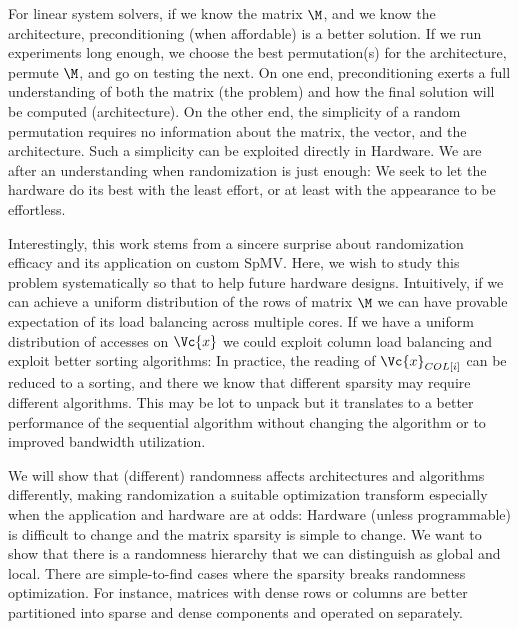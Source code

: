 \documentclass[manuscript,screen]{acmart}
\begin{document}
For linear system solvers, if we know the matrix $\M$, and we know the
architecture, preconditioning (when affordable) is a better solution.
If we run experiments long enough, we choose the best permutation(s)
for the architecture, permute $\M$, and go on testing the next.  On
one end, preconditioning exerts a full understanding of both the
matrix (the problem) and how the final solution will be computed
(architecture).  On the other end, the simplicity of a random
permutation requires no information about the matrix, the vector, and
the architecture. Such a simplicity can be exploited directly in
Hardware. We are after an understanding when randomization is just
enough: We seek to let the hardware do its best with the least effort,
or at least with the appearance to be effortless.


Interestingly, this work stems from a sincere surprise about
randomization efficacy and its application on custom SpMV. Here, we
wish to study this problem systematically so that to help future
hardware designs. Intuitively, if we can achieve a uniform
distribution of the rows of matrix $\M$ we can have provable
expectation of its load balancing across multiple cores. If we have a
uniform distribution of accesses on $\Vc{x}$ we could exploit column
load balancing and exploit better sorting algorithms: In practice, the
reading of $\Vc{x}_{COL[i]}$ can be reduced to a sorting, and there we know
that different sparsity  may require different algorithms. This may be 
lot to unpack but it translates to a better performance of the
sequential algorithm without changing the algorithm or to improved bandwidth
utilization.


We will show that (different) randomness affects architectures and
algorithms differently, making randomization a suitable optimization
transform especially when the application and hardware are at odds:
Hardware (unless programmable) is difficult to change and the matrix
sparsity is simple to change. We want to show that there is a
randomness hierarchy that we can distinguish as global and
local. There are simple-to-find cases where the sparsity breaks
randomness optimization.  For instance, matrices with dense rows or
columns are better partitioned into sparse and dense components and
operated on separately.
\newpage 
{}
\end{document}

